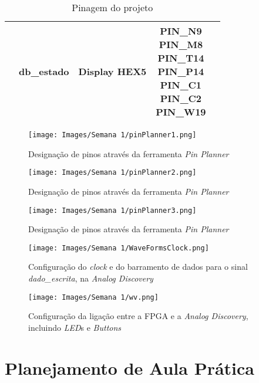 \documentclass[amsmath,amssymb,floatfix]{report}
\begin{document}
\begin{table}[H]
\begin{tabular}{c|c|c|c|c|}
\multicolumn{1}{|c|}{}                           & db\_estado              & Display HEX5 & \thead{PIN\_N9 \\ PIN\_M8 \\ PIN\_T14 \\  PIN\_P14 \\  PIN\_C1 \\ PIN\_C2 \\ PIN\_W19}                                                                       & \multicolumn{1}{l|}{}          \\ \hline
\end{tabular}
\caption{Pinagem do projeto}
\label{tab:pinagemFPGA1}
\end{table}

\begin{figure}[H]
\centering
\texttt{[image: Images/Semana 1/pinPlanner1.png]} 
    \caption{Designação de pinos através da ferramenta \textit{Pin Planner}}
    \label{fig:pinPlanner1}
\end{figure} 

\begin{figure}[H]
\centering
\texttt{[image: Images/Semana 1/pinPlanner2.png]} 
    \caption{Designação de pinos através da ferramenta \textit{Pin Planner}}
    \label{fig:pinPlanner2}
\end{figure} 

\begin{figure}[H]
\centering
\texttt{[image: Images/Semana 1/pinPlanner3.png]} 
    \caption{Designação de pinos através da ferramenta \textit{Pin Planner}}
    \label{fig:pinPlanner3}
\end{figure} 

\begin{figure}[H]
\centering
\texttt{[image: Images/Semana 1/WaveFormsClock.png]} 
    \caption{Configuração do \textit{clock} e do barramento de dados para o sinal \textit{dado\_escrita}, na \textit{Analog Discovery}}
    \label{fig:wfClock}
\end{figure} 

\begin{figure}[H]
\centering
\texttt{[image: Images/Semana 1/wv.png]} 
    \caption{Configuração da ligação entre a FPGA e a \textit{Analog Discovery}, incluindo \textit{LED}s e \textit{Buttons}}
    \label{fig:wv}
\end{figure}

\section{Planejamento de Aula Prática}
\end{document}
